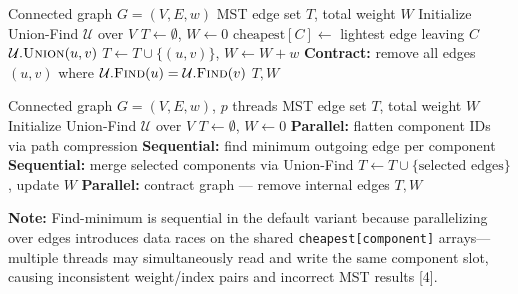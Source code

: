 \documentclass[12pt, a4paper]{article}
\begin{document}
\begin{algorithm}[H]
\caption{Bor\r{u}vka's MST (Sequential, with Graph Contraction) [3,4]}
\begin{algorithmic}[1]
\Require Connected graph $G = (V, E, w)$
\Ensure MST edge set $T$, total weight $W$
\State Initialize Union-Find $\mathcal{U}$ over $V$
\State $T \gets \emptyset$,\; $W \gets 0$
        \State $\text{cheapest}[C] \gets$ lightest edge leaving $C$
    \EndFor
            \State $\mathcal{U}.\textsc{Union}(u, v)$
            \State $T \gets T \cup \{(u,v)\}$,\; $W \gets W + w$
        \EndIf
    \EndFor
    \State \textbf{Contract:} remove all edges $(u,v)$ where $\mathcal{U}.\textsc{Find}(u) = \mathcal{U}.\textsc{Find}(v)$
\EndWhile
\State \Return $T, W$
\end{algorithmic}
\end{algorithm}

\begin{algorithm}[H]
\caption{Bor\r{u}vka's MST (Parallel --- Default) [3,4,6]}
\begin{algorithmic}[1]
\Require Connected graph $G = (V, E, w)$, $p$ threads
\Ensure MST edge set $T$, total weight $W$
\State Initialize Union-Find $\mathcal{U}$ over $V$
\State $T \gets \emptyset$,\; $W \gets 0$
    \State \textbf{Parallel:} flatten component IDs via path compression 
    \State \textbf{Sequential:} find minimum outgoing edge per component 
    \State \textbf{Sequential:} merge selected components via Union-Find
    \State $T \gets T \cup \{\text{selected edges}\}$,\; update $W$
    \State \textbf{Parallel:} contract graph --- remove internal edges 
\EndWhile
\State \Return $T, W$
\end{algorithmic}
\end{algorithm}

\textbf{Note:} Find-minimum is sequential in the default variant because parallelizing over edges introduces data races on the shared \texttt{cheapest[component]} arrays---multiple threads may simultaneously read and write the same component slot, causing inconsistent weight/index pairs and incorrect MST results [4].
\end{document}
